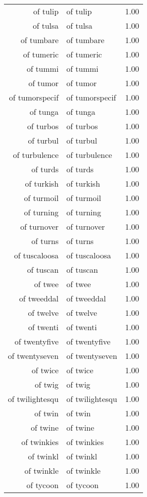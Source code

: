\begin{table}[ht]
\begin{tabular}{rlr}
  of tulip & of tulip & 1.00 \\ 
  of tulsa & of tulsa & 1.00 \\ 
  of tumbare & of tumbare & 1.00 \\ 
  of tumeric & of tumeric & 1.00 \\ 
  of tummi & of tummi & 1.00 \\ 
  of tumor & of tumor & 1.00 \\ 
  of tumorspecif & of tumorspecif & 1.00 \\ 
  of tunga & of tunga & 1.00 \\ 
  of turbos & of turbos & 1.00 \\ 
  of turbul & of turbul & 1.00 \\ 
  of turbulence & of turbulence & 1.00 \\ 
  of turds & of turds & 1.00 \\ 
  of turkish & of turkish & 1.00 \\ 
  of turmoil & of turmoil & 1.00 \\ 
  of turning & of turning & 1.00 \\ 
  of turnover & of turnover & 1.00 \\ 
  of turns & of turns & 1.00 \\ 
  of tuscaloosa & of tuscaloosa & 1.00 \\ 
  of tuscan & of tuscan & 1.00 \\ 
  of twee & of twee & 1.00 \\ 
  of tweeddal & of tweeddal & 1.00 \\ 
  of twelve & of twelve & 1.00 \\ 
  of twenti & of twenti & 1.00 \\ 
  of twentyfive & of twentyfive & 1.00 \\ 
  of twentyseven & of twentyseven & 1.00 \\ 
  of twice & of twice & 1.00 \\ 
  of twig & of twig & 1.00 \\ 
  of twilightesqu & of twilightesqu & 1.00 \\ 
  of twin & of twin & 1.00 \\ 
  of twine & of twine & 1.00 \\ 
  of twinkies & of twinkies & 1.00 \\ 
  of twinkl & of twinkl & 1.00 \\ 
  of twinkle & of twinkle & 1.00 \\ 
  of tycoon & of tycoon & 1.00 \\ 

\end{tabular}
\end{table}
